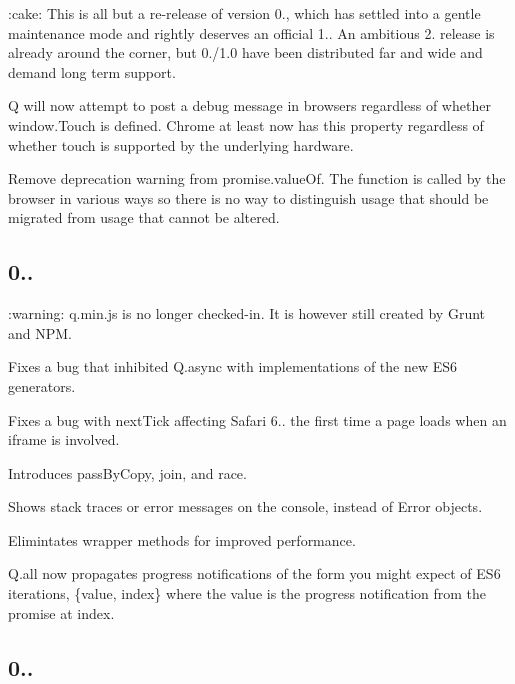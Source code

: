 \+:cake\+: This is all but a re-\/release of version 0., which has settled into a gentle maintenance mode and rightly deserves an official 1.. An ambitious 2. release is already around the corner, but 0./1.0 have been distributed far and wide and demand long term support.


\begin{DoxyItemize}
\item Q will now attempt to post a debug message in browsers regardless of whether window.\+Touch is defined. Chrome at least now has this property regardless of whether touch is supported by the underlying hardware.
\item Remove deprecation warning from {\ttfamily promise.\+value\+Of}. The function is called by the browser in various ways so there is no way to distinguish usage that should be migrated from usage that cannot be altered.
\end{DoxyItemize}

\subsection*{0..}


\begin{DoxyItemize}
\item \+:warning\+: {\ttfamily q.\+min.\+js} is no longer checked-\/in. It is however still created by Grunt and N\+PM.
\item Fixes a bug that inhibited {\ttfamily Q.\+async} with implementations of the new E\+S6 generators.
\item Fixes a bug with {\ttfamily next\+Tick} affecting Safari 6.. the first time a page loads when an {\ttfamily iframe} is involved.
\item Introduces {\ttfamily pass\+By\+Copy}, {\ttfamily join}, and {\ttfamily race}.
\item Shows stack traces or error messages on the console, instead of {\ttfamily Error} objects.
\item Elimintates wrapper methods for improved performance.
\item {\ttfamily Q.\+all} now propagates progress notifications of the form you might expect of E\+S6 iterations, {\ttfamily \{value, index\}} where the {\ttfamily value} is the progress notification from the promise at {\ttfamily index}.
\end{DoxyItemize}

\subsection*{0..}



